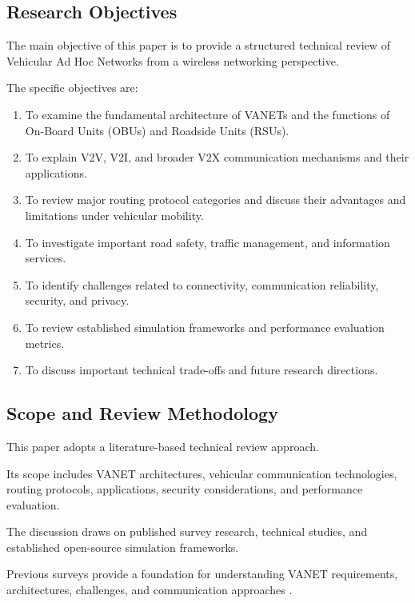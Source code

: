 \subsection{Research Objectives}

The main objective of this paper
is to provide a structured
technical review of
Vehicular Ad Hoc Networks
from a wireless networking
perspective.

The specific objectives are:

\begin{enumerate}
\item To examine the fundamental
architecture of VANETs and
the functions of On-Board Units
(OBUs) and Roadside Units (RSUs).

\item To explain V2V, V2I,
and broader V2X communication
mechanisms and their applications.

\item To review major routing
protocol categories and discuss
their advantages and limitations
under vehicular mobility.

\item To investigate important
road safety, traffic management,
and information services.

\item To identify challenges
related to connectivity,
communication reliability,
security, and privacy.

\item To review established
simulation frameworks and
performance evaluation metrics.

\item To discuss important
technical trade-offs and
future research directions.
\end{enumerate}

\subsection{Scope and Review Methodology}

This paper adopts a
literature-based technical
review approach.

Its scope includes
VANET architectures,
vehicular communication
technologies, routing
protocols, applications,
security considerations,
and performance evaluation.

The discussion draws on
published survey research,
technical studies, and
established open-source
simulation frameworks.

Previous surveys provide
a foundation for understanding
VANET requirements,
architectures, challenges,
and communication approaches
\cite{Hartenstein2008,Karagiannis2011,Zeadally2012}.

